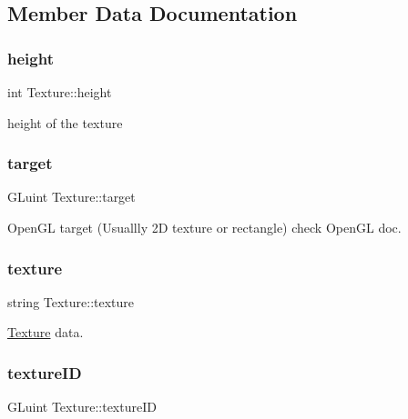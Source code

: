 \subsection{Member Data Documentation}
\mbox{\label{classTexture_ad37c395c65ff8bde86230908027a6fcd}} 
\subsubsection{\texorpdfstring{height}{height}}
{\footnotesize\ttfamily int Texture\+::height}



height of the texture 

\mbox{\label{classTexture_adc0777da3ba92545967d6cf9b8d14926}} 
\subsubsection{\texorpdfstring{target}{target}}
{\footnotesize\ttfamily G\+Luint Texture\+::target}



Open\+GL target (Usuallly 2D texture or rectangle) check Open\+GL doc. 

\mbox{\label{classTexture_a3b01478de1035e39ed6c88f12a0d6c1c}} 
\subsubsection{\texorpdfstring{texture}{texture}}
{\footnotesize\ttfamily string Texture\+::texture}



\mbox{\hyperlink{classTexture}{Texture}} data. 

\mbox{\label{classTexture_ab61a414e1ed356a30c48952d65227691}} 
\subsubsection{\texorpdfstring{texture\+ID}{textureID}}
{\footnotesize\ttfamily G\+Luint Texture\+::texture\+ID}



